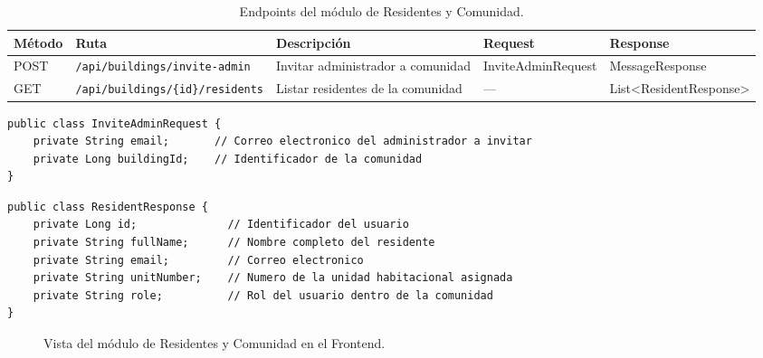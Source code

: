 \begin{table}[H]
\centering
\small
\begin{tabular}{|p{}|p{}|p{}|p{}|p{}|}
\hline
\textbf{Método} & \textbf{Ruta} & \textbf{Descripción} & \textbf{Request} & \textbf{Response} \\\hline
POST & \texttt{/api/buildings/invite-admin} & Invitar administrador a comunidad & InviteAdmin\-Request & Message\-Response \\\hline
GET & \texttt{/api/buildings/\{id\}/residents} & Listar residentes de la comunidad & --- & List<Resident\-Response> \\\hline
\end{tabular}
\caption{Endpoints del módulo de Residentes y Comunidad.}
\label{tab:endpoints-residentes}
\end{table}

\begin{lstlisting}[style=javadto, title={\texttt{InviteAdminRequest}}]
public class InviteAdminRequest {
    private String email;       // Correo electronico del administrador a invitar
    private Long buildingId;    // Identificador de la comunidad
}
\end{lstlisting}

\begin{lstlisting}[style=javadto, title={\texttt{ResidentResponse}}]
public class ResidentResponse {
    private Long id;              // Identificador del usuario
    private String fullName;      // Nombre completo del residente
    private String email;         // Correo electronico
    private String unitNumber;    // Numero de la unidad habitacional asignada
    private String role;          // Rol del usuario dentro de la comunidad
}
\end{lstlisting}

\begin{figure}[H]
  \centering
  \caption{Vista del módulo de Residentes y Comunidad en el Frontend.}
  \label{fig:anexo-residentes-frontend}
\end{figure}
